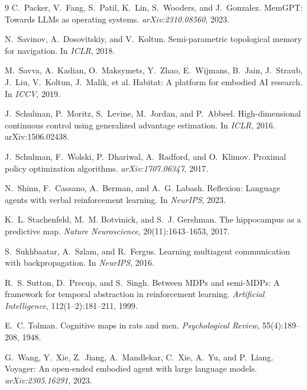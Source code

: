 \documentclass{article}
\begin{document}
{\begin{thebibliography}{9}
C.~Packer, V.~Fang, S.~Patil, K.~Lin, S.~Wooders, and J.~Gonzalez.
\newblock MemGPT: Towards LLMs as operating systems.
\newblock \emph{arXiv:2310.08560}, 2023.

N.~Savinov, A.~Dosovitskiy, and V.~Koltun.
\newblock Semi-parametric topological memory for navigation.
\newblock In \emph{ICLR}, 2018.

M.~Savva, A.~Kadian, O.~Maksymets, Y.~Zhao, E.~Wijmans, B.~Jain, J.~Straub, J.~Liu, V.~Koltun, J.~Malik, et al.
\newblock Habitat: A platform for embodied AI research.
\newblock In \emph{ICCV}, 2019.

J.~Schulman, P.~Moritz, S.~Levine, M.~Jordan, and P.~Abbeel.
\newblock High-dimensional continuous control using generalized advantage estimation.
\newblock In \emph{ICLR}, 2016.
\newblock arXiv:1506.02438.

J.~Schulman, F.~Wolski, P.~Dhariwal, A.~Radford, and O.~Klimov.
\newblock Proximal policy optimization algorithms.
\newblock \emph{arXiv:1707.06347}, 2017.

N.~Shinn, F.~Cassano, A.~Berman, and A.~G. Labash.
\newblock Reflexion: Language agents with verbal reinforcement learning.
\newblock In \emph{NeurIPS}, 2023.

K.~L. Stachenfeld, M.~M. Botvinick, and S.~J. Gershman.
\newblock The hippocampus as a predictive map.
\newblock \emph{Nature Neuroscience}, 20(11):1643--1653, 2017.

S.~Sukhbaatar, A.~Szlam, and R.~Fergus.
\newblock Learning multiagent communication with backpropagation.
\newblock In \emph{NeurIPS}, 2016.

R.~S. Sutton, D.~Precup, and S.~Singh.
\newblock Between MDPs and semi-MDPs: A framework for temporal abstraction in reinforcement learning.
\newblock \emph{Artificial Intelligence}, 112(1--2):181--211, 1999.

E.~C. Tolman.
\newblock Cognitive maps in rats and men.
\newblock \emph{Psychological Review}, 55(4):189--208, 1948.

G.~Wang, Y.~Xie, Z.~Jiang, A.~Mandlekar, C.~Xie, A.~Yu, and P.~Liang.
\newblock Voyager: An open-ended embodied agent with large language models.
\newblock \emph{arXiv:2305.16291}, 2023.


\end{thebibliography}}
\end{document}
